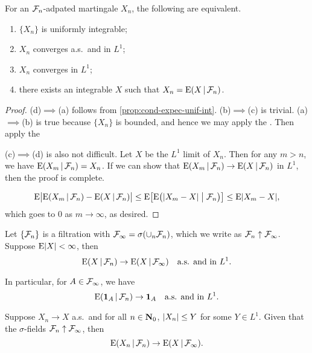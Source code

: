 \begin{thm}
    For an $\mathcal{F}_n$-adpated martingale $X_n$, the following are equivalent. 
    \begin{enumerate}
        \item $\{X_n\}$ is uniformly integrable;
        \item $X_n$ converges a.s.\ and in $L^1$;
        \item $X_n$ converges in $L^1$;
        \item there exists an integrable $X$ such that $X_n = \mathop{}\!\mathrm{E}(X \,|\, \mathcal{F}_n)$.
    \end{enumerate}
\end{thm}
\begin{proof}
    (d)$\implies$(a) follows from \cref{prop:cond-expec-unif-int}. (b)$\implies$(c) is trivial. (a)$\implies$(b) is true because $\{X_n\}$ is bounded, and hence we may apply the . Then apply the 

    (c)$\implies$(d) is also not difficult. Let $X$ be the $L^1$ limit of $X_n$. Then for any $m > n$, we have $\mathop{}\!\mathrm{E}(X_m \,|\, \mathcal{F}_n) = X_n$. If we can show that $\mathop{}\!\mathrm{E}(X_m \,|\, \mathcal{F}_n) \to \mathop{}\!\mathrm{E}(X\,|\, \mathcal{F}_n)$ in $L^1$, then the proof is complete.

    \[
        \mathop{}\!\mathrm{E}\bigl\vert\mathop{}\!\mathrm{E}(X_m \,|\, \mathcal{F}_n) - \mathop{}\!\mathrm{E}(X\,|\, \mathcal{F}_n)\bigr\rvert \leq \mathop{}\!\mathrm{E}\bigl[ \mathop{}\!\mathrm{E}\bigl(\lvert X_m - X \rvert \bigm\vert \mathcal{F}_n\bigr) \bigr]\leq\mathop{}\!\mathrm{E}\lvert X_m - X \rvert,
    \] which goes to $0$ as $m \to \infty$, as desired.
\end{proof}

\begin{namedthm}
    Let $\{\mathcal{F}_n\}$ is a filtration with $\mathcal{F}_\infty = \sigma(\cup_n \mathcal{F}_n)$, which we write as $\mathcal{F}_n \uparrow \mathcal{F}_\infty$. Suppose $\mathop{}\!\mathrm{E} \lvert X \rvert<\infty$, then \[
        \mathop{}\!\mathrm{E}(X \,|\, \mathcal{F}_n) \to \mathop{}\!\mathrm{E}(X\,|\, \mathcal{F}_\infty) \quad \text{a.s. and in }L^1.
    \]

    In particular, for $A \in \mathcal{F}_\infty$, we have \[
        \mathop{}\!\mathrm{E}(\mathbf{1}_A \,|\, \mathcal{F}_n) \to \mathbf{1}_A \quad \text{a.s. and in }L^1.
    \]
\end{namedthm}

\begin{namedthm}
    Suppose $X_n \to X$ a.s.\ and for all $n \in \mathbf{N}_0$, $\lvert X_n \rvert \leq Y$ for some $Y \in L^1$. Given that the $\sigma$-fields $\mathcal{F}_n \uparrow \mathcal{F}_\infty$, then \[
        \mathop{}\!\mathrm{E}(X_n \,|\, \mathcal{F}_n) \to \mathop{}\!\mathrm{E}(X \,|\, \mathcal{F}_\infty).
    \]

    
\end{namedthm}

